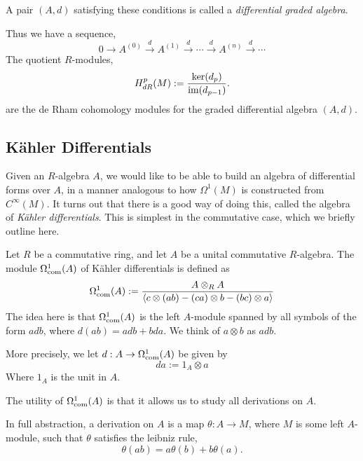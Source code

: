 A pair $(A,d)$ satisfying these conditions is called a \emph{differential graded algebra}.

Thus we have a sequence,
\begin{equation*}
    0\rightarrow A^{(0)} \xrightarrow{d} A^{(1)} \xrightarrow{d} \cdots \xrightarrow{d} A^{(n)} \xrightarrow{d} \cdots
\end{equation*}
The quotient $R$-modules,
\begin{equation*}
    H^p_{dR}(M) := \frac{\ker(d_{p})}{\operatorname{im}(d_{p-1})}.
\end{equation*}
are the de Rham cohomology modules for the graded differential algebra $(A,d)$.
\subsection{K\"ahler Differentials}
Given an $R$-algebra $A$, we would like to be able to build an algebra
of differential forms over $A$, in a manner analogous to how $\Omega^1(M)$
is constructed from $C^\infty(M)$. It turns out that there is a good way of doing
this, called the algebra of \emph{K\"ahler differentials}. This is simplest in the commutative case,
which we briefly outline here.

Let $R$ be a commutative ring, and let $A$ be a unital commutative $R$-algebra. The module
$\Omega^1_{\operatorname{com}}(A)$
of K\"ahler differentials is defined as
\begin{equation*}
    \Omega^1_{\operatorname{com}}(A) := \frac{A\otimes_R A}{\langle c\otimes(ab)-(ca)\otimes b-(bc)\otimes a\rangle}
\end{equation*}
The idea here is that $\Omega^1_{\operatorname{com}}(A)$ is the left $A$-module spanned by all
symbols of the form $adb$, where $d(ab) = adb+bda$. We think of $a\otimes b$
as $adb$.

More precisely, we let $d:A\rightarrow \Omega^1_{\operatorname{com}}(A)$ be given by
\begin{equation*}
    da := 1_A\otimes a
\end{equation*}
Where $1_A$ is the unit in $A$.

The utility of $\Omega^1_{\operatorname{com}}(A)$ is that it allows us to study all
derivations on $A$. 

In full abstraction, a derivation on $A$ is a map $\theta:A\rightarrow M$, where
$M$ is some left $A$-module, such that $\theta$ satisfies the leibniz rule,
\begin{equation*}
    \theta(ab) = a\theta(b)+b\theta(a).
\end{equation*}

